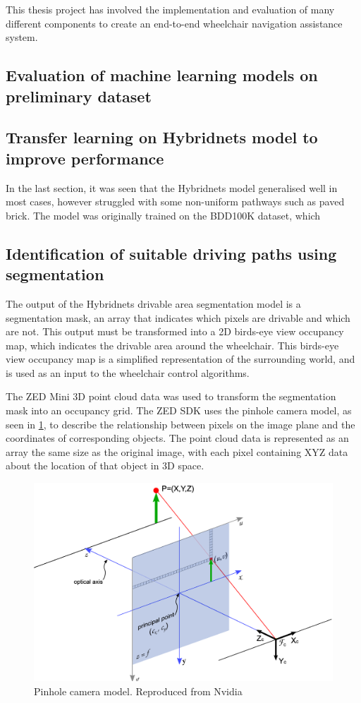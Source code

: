 This thesis project has involved the implementation and evaluation
of many different components to create an end-to-end wheelchair
navigation assistance system.

\subsection{Evaluation of machine learning models on preliminary dataset}

\subsection{Transfer learning on Hybridnets model to improve performance}
In the last section, it was seen that the Hybridnets model generalised well in most cases,
however struggled with some non-uniform pathways such as paved brick.
The model was originally trained on the BDD100K dataset, which 

\pagebreak
\subsection{Identification of suitable driving paths using segmentation}
The output of the Hybridnets drivable area segmentation model is a
segmentation mask, an array that indicates which pixels are drivable
and which are not.
This output must be transformed into a 2D birds-eye view occupancy map,
which indicates the drivable area around the wheelchair. This birds-eye
view occupancy map is a simplified representation of the surrounding world,
and is used as an input to the wheelchair control algorithms.

The ZED Mini 3D point cloud data was used
to transform the segmentation mask into an occupancy grid.
The ZED SDK uses the pinhole camera model, as seen in \cref{fig:pinhole_camera_model},
to describe the relationship between pixels on the image plane
and the coordinates of corresponding objects.
The point cloud data is represented as an array the same size as
the original image, with each pixel containing XYZ data about the location of that object
in 3D space.
\begin{figure}[b]
    \centering
    \includegraphics[width=0.6\linewidth]{images/pinhole_camera_model.png}
    \caption{Pinhole camera model. Reproduced from Nvidia \cite{nvidiaVisionProgrammingInterface}}
    \label{fig:pinhole_camera_model}
\end{figure}

